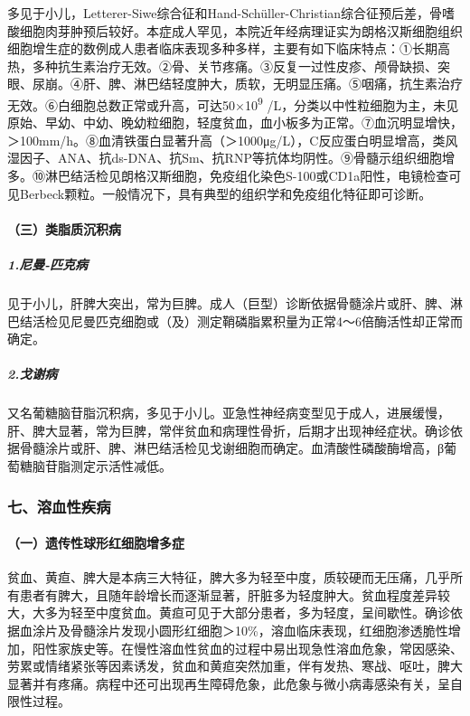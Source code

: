 多见于小儿，Letterer-Siwe综合征和Hand-Schüller-Christian综合征预后差，骨嗜酸细胞肉芽肿预后较好。本症成人罕见，本院近年经病理证实为朗格汉斯细胞组织细胞增生症的数例成人患者临床表现多种多样，主要有如下临床特点：①长期高热，多种抗生素治疗无效。②骨、关节疼痛。③反复一过性皮疹、颅骨缺损、突眼、尿崩。④肝、脾、淋巴结轻度肿大，质软，无明显压痛。⑤咽痛，抗生素治疗无效。⑥白细胞总数正常或升高，可达50×10\textsuperscript{9}
/L，分类以中性粒细胞为主，未见原始、早幼、中幼、晚幼粒细胞，轻度贫血，血小板多为正常。⑦血沉明显增快，＞100mm/h。⑧血清铁蛋白显著升高（＞1000μg/L），C反应蛋白明显增高，类风湿因子、ANA、抗ds-DNA、抗Sm、抗RNP等抗体均阴性。⑨骨髓示组织细胞增多。⑩淋巴结活检见朗格汉斯细胞，免疫组化染色S-100或CD1a阳性，电镜检查可见Berbeck颗粒。一般情况下，具有典型的组织学和免疫组化特征即可诊断。

\paragraph{（三）类脂质沉积病}

\subparagraph{1.尼曼-匹克病}

见于小儿，肝脾大突出，常为巨脾。成人（巨型）诊断依据骨髓涂片或肝、脾、淋巴结活检见尼曼匹克细胞或（及）测定鞘磷脂累积量为正常4～6倍酶活性却正常而确定。

\subparagraph{2.戈谢病}

又名葡糖脑苷脂沉积病，多见于小儿。亚急性神经病变型见于成人，进展缓慢，肝、脾大显著，常为巨脾，常伴贫血和病理性骨折，后期才出现神经症状。确诊依据骨髓涂片或肝、脾、淋巴结活检见戈谢细胞而确定。血清酸性磷酸酶增高，β葡萄糖脑苷脂测定示活性减低。

\subsubsection{七、溶血性疾病}

\paragraph{（一）遗传性球形红细胞增多症}

贫血、黄疸、脾大是本病三大特征，脾大多为轻至中度，质较硬而无压痛，几乎所有患者有脾大，且随年龄增长而逐渐显著，肝脏多为轻度肿大。贫血程度差异较大，大多为轻至中度贫血。黄疸可见于大部分患者，多为轻度，呈间歇性。确诊依据血涂片及骨髓涂片发现小圆形红细胞＞10\%，溶血临床表现，红细胞渗透脆性增加，阳性家族史等。在慢性溶血性贫血的过程中易出现急性溶血危象，常因感染、劳累或情绪紧张等因素诱发，贫血和黄疸突然加重，伴有发热、寒战、呕吐，脾大显著并有疼痛。病程中还可出现再生障碍危象，此危象与微小病毒感染有关，呈自限性过程。


